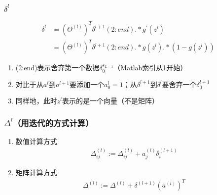 

\subsubsection{$\delta^{l}$}
\begin{equation}\begin{aligned}
	\delta^{l} &= (\Theta^{(l)})^T \delta^{l+1}(2:end) .* g^{'}(z^{l}) \\
	&= (\Theta^{(l)})^T \delta^{l+1}(2:end) .* g(z^{l}) .* (1-g(z^{l}))
\end{aligned}\end{equation}
\begin{enumerate}
	\item (2:end)表示舍弃第一个数据$\delta_0^{s_{L-1}}$（Matlab索引从1开始）
	\item 对比于从$a^{l}$到$a^{l+1}$要添加一个$a_0^{l}=1$；从$\delta^{l+1}$到$\delta^{l}$要舍弃一个$\delta_0^{l+1}$
	\item 同样地，此时$z^{l}$表示的是一个向量（不是矩阵）
\end{enumerate}

\subsubsection{$\Delta^{l}$（用迭代的方式计算）}
\begin{enumerate}
	\item 数值计算方式
	\begin{equation}\begin{aligned}
		\Delta_{ij}^{(l)} := \Delta_{ij}^{(l)} + a_j^{(l)} \delta_i^{(l+1)}
	\end{aligned}\end{equation}
	\item 矩阵计算方式
	\begin{equation}\begin{aligned}
		\Delta^{(l)} := \Delta^{(l)} + \delta^{(l+1)} (a^{(l)})^T
	\end{aligned}\end{equation}
\end{enumerate}

